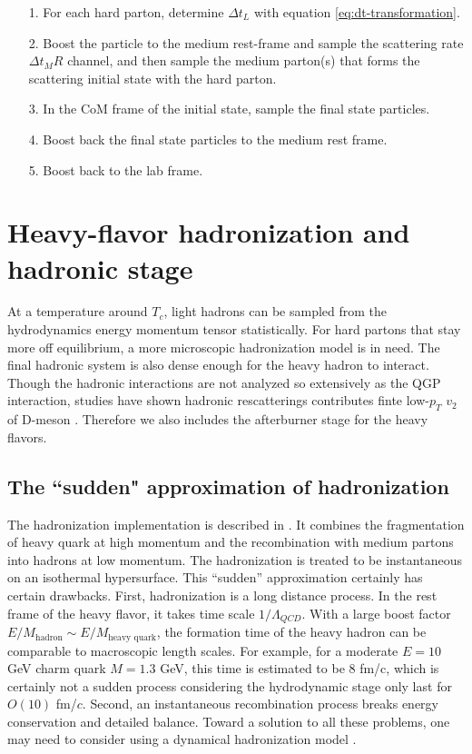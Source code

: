 \begin{itemize}
\item[1.] For each hard parton, determine $\Delta t_L$ with equation \ref{eq:dt-transformation}.
\item[2.] Boost the particle to the medium rest-frame and sample the scattering rate $\Delta t_M R$ channel, and then sample the medium parton(s) that forms the scattering initial state with the hard parton.
\item[3.] In the CoM frame of the initial state, sample the final state particles.
\item[4.] Boost back the final state particles to the medium rest frame.
\item[5.] Boost back to the lab frame.
\end{itemize}

\section{Heavy-flavor hadronization and hadronic stage}
\label{section:hadronization}
At a temperature around $T_c$, light hadrons can be sampled from the hydrodynamics energy momentum tensor statistically.
For hard partons that stay more off equilibrium, a more microscopic hadronization model is in need.
The final hadronic system is also dense enough for the heavy hadron to interact.
Though the hadronic interactions are not analyzed so extensively as the QGP interaction, studies have shown hadronic rescatterings contributes finte low-$p_T$ $v_2$ of D-meson \cite{Cao:2015hia}.
Therefore we also includes the afterburner stage for the heavy flavors.

\subsection{The ``sudden" approximation of hadronization} 
The hadronization implementation is described in \cite{Cao:2013ita}.
It combines the fragmentation of heavy quark at high momentum and the recombination with medium partons into hadrons at low momentum.
The hadronization is treated to be instantaneous on an isothermal hypersurface.
This ``sudden'' approximation certainly has certain drawbacks.
First, hadronization is a long distance process. 
In the rest frame of the heavy flavor, it takes time scale $1/\Lambda_{QCD}$. 
With a large boost factor $E/M_{\textrm{hadron}}\sim E/M_{\textrm{heavy quark}}$, the formation time of the heavy hadron can be comparable to macroscopic length scales.
For example, for a moderate $E=10$ GeV charm quark $M=1.3$ GeV, this time is estimated to be $8$ fm/c, which is certainly not a sudden process considering the hydrodynamic stage only last for $O(10)$ fm/$c$.
Second, an instantaneous recombination process breaks energy conservation and detailed balance.
Toward a solution to all these problems, one may need to consider using a dynamical hadronization model \cite{He:2019vgs}.

